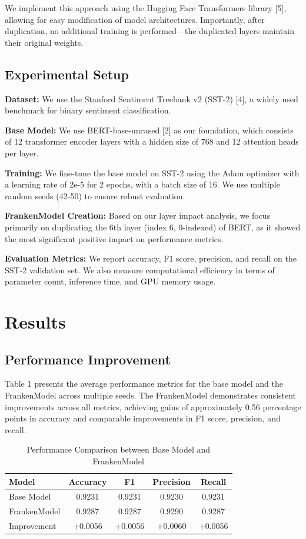 \documentclass{article}
\begin{document}
We implement this approach using the Hugging Face Transformers library [5], allowing for easy modification of model architectures. Importantly, after duplication, no additional training is performed—the duplicated layers maintain their original weights.

\subsection{Experimental Setup}
\textbf{Dataset:} We use the Stanford Sentiment Treebank v2 (SST-2) [4], a widely used benchmark for binary sentiment classification.

\textbf{Base Model:} We use BERT-base-uncased [2] as our foundation, which consists of 12 transformer encoder layers with a hidden size of 768 and 12 attention heads per layer.

\textbf{Training:} We fine-tune the base model on SST-2 using the Adam optimizer with a learning rate of 2e-5 for 2 epochs, with a batch size of 16. We use multiple random seeds (42-50) to ensure robust evaluation.

\textbf{FrankenModel Creation:} Based on our layer impact analysis, we focus primarily on duplicating the 6th layer (index 6, 0-indexed) of BERT, as it showed the most significant positive impact on performance metrics.

\textbf{Evaluation Metrics:} We report accuracy, F1 score, precision, and recall on the SST-2 validation set. We also measure computational efficiency in terms of parameter count, inference time, and GPU memory usage.

\section{Results}

\subsection{Performance Improvement}
Table 1 presents the average performance metrics for the base model and the FrankenModel across multiple seeds. The FrankenModel demonstrates consistent improvements across all metrics, achieving gains of approximately 0.56 percentage points in accuracy and comparable improvements in F1 score, precision, and recall.

\begin{table}[h]
\caption{Performance Comparison between Base Model and FrankenModel}
\centering
\begin{tabular}{lcccc}
\toprule
\textbf{Model} & \textbf{Accuracy} & \textbf{F1} & \textbf{Precision} & \textbf{Recall} \\
\midrule
Base Model & 0.9231 & 0.9231 & 0.9230 & 0.9231 \\
FrankenModel & 0.9287 & 0.9287 & 0.9290 & 0.9287 \\
\midrule
Improvement & +0.0056 & +0.0056 & +0.0060 & +0.0056 \\
\bottomrule
\end{tabular}
\end{table}
\end{document}
